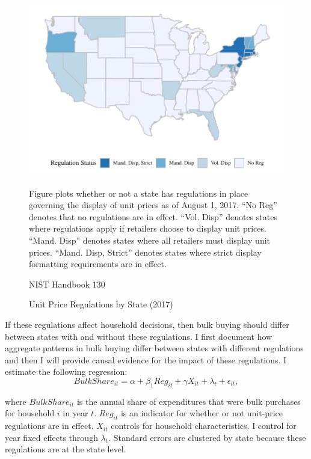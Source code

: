 \documentclass[AER]{AEA_mal}
\begin{document}
\begin{figure}[!htb]
\centering
\caption{Unit Price Regulations by State (2017)}
\includegraphics[width = 5in, height = 3in]{../5_figures/unitPriceLaws.pdf}
\begin{figurenotes}
Figure plots whether or not a state has regulations in place governing the display of unit prices as of August 1, 2017. ``No Reg'' denotes that no regulations are in effect. ``Vol. Disp'' denotes states where regulations apply if retailers choose to display unit prices. ``Mand. Disp'' denotes states where all retailers must display unit prices. ``Mand. Disp, Strict'' denotes states where strict display formatting requirements are in effect.
\end{figurenotes}
\begin{figurenotes}[Source]
NIST Handbook 130
\end{figurenotes}
\label{fig:unitPriceLaws}
\end{figure}

If these regulations affect household decisions, then bulk buying should differ between states with and without these regulations. I first document how aggregate patterns in bulk buying differ between states with different regulations and then I will provide causal evidence for the impact of these regulations. I estimate the following regression:
\begin{equation}
\label{eq:unitPrice}
BulkShare_{it} = \alpha + \beta_1 Reg_{it} + \gamma X_{it} + \lambda_t + \epsilon_{it},
\end{equation}

where $BulkShare_{it}$ is the annual share of expenditures that were bulk purchases for household $i$ in year $t$. $Reg_{it}$ is an indicator for whether or not unit-price regulations are in effect. $X_{it}$ controls for household characteristics. I control for year fixed effects through $\lambda_t$. Standard errors are clustered by state because these regulations are at the state level.
\end{document}
